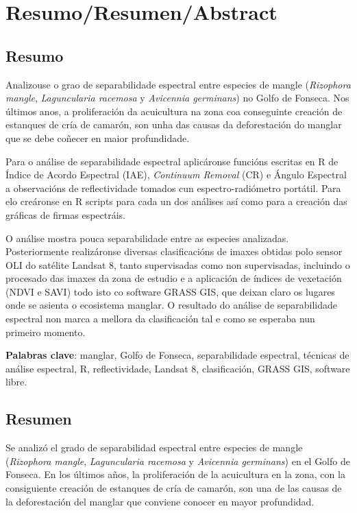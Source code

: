 
\chapter*{Resumo/Resumen/Abstract}
\section*{Resumo}
Analizouse o grao de separabilidade espectral entre especies de mangle (\textit{Rizophora mangle}, \textit{Laguncularia racemosa} y \textit{Avicennia germinans}) no Golfo de Fonseca. Nos últimos anos, a proliferación da acuicultura na zona coa conseguinte creación de estanques de cría de camarón, son unha das causas da deforestación do manglar que se debe coñecer en maior profundidade.

Para o análise de separabilidade espectral aplicáronse funcións escritas en R de Índice de Acordo Espectral (IAE), \textit{Continuum Removal} (CR) e Ángulo Espectral a observacións de reflectividade tomados cun espectro-radiómetro portátil. Para elo creáronse en R scripts para cada un dos análises así como para a creación das gráficas de firmas espectráis.

O análise mostra pouca separabilidade entre as especies analizadas. Posteriormente realizáronse diversas clasificacións de imaxes obtidas polo sensor OLI do satélite Landsat 8, tanto supervisadas como non supervisadas, incluindo o procesado das imaxes da zona de estudio e a aplicación de índices de vexetación (NDVI e SAVI) todo isto co software GRASS GIS, que deixan claro os lugares onde se asienta o ecosistema manglar. O resultado do análise de separabilidade espectral non marca a mellora da clasificación tal e como se esperaba nun primeiro momento.

\noindent\textbf{Palabras clave}: manglar, Golfo de Fonseca, separabilidade espectral, técnicas de análise espectral, R, reflectividade, Landsat 8, clasificación, GRASS GIS, software libre.

\section*{Resumen}
Se analizó el grado de separabilidad espectral entre especies de mangle (\textit{Rizophora mangle}, \textit{Laguncularia racemosa} y \textit{Avicennia germinans}) en el Golfo de Fonseca. En los últimos años, la proliferación de la acuicultura en la zona, con la consiguiente creación de estanques de cría de camarón, son una de las causas de la deforestación del manglar que conviene conocer en mayor profundidad.

